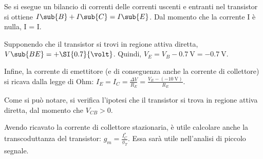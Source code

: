Se si esegue un bilancio di correnti delle correnti uscenti e entranti nel transistor si ottiene $I\sub{B}+I\sub{C}=I\sub{E}$. Dal momento che la corrente I è nulla, I = I.

Supponendo che il transistor si trovi in regione attiva diretta, $V\sub{BE}=+\SI{0.7}{\volt}$. Quindi, $V_E=V_B-\SI{0.7}{\volt}= -\SI{0.7}{\volt}$.

Infine, la corrente di emettitore (e di conseguenza anche la corrente di collettore) si ricava dalla legge di Ohm: $I_E=I_C=\frac{\Delta V}{R_E}=\frac{V_E-(-\SI{10}{\volt})}{R_E}$. 

Come si può notare, si verifica l'ipotesi che il transistor si trova in regione attiva diretta, dal momento che $V_{CB}>0$.

Avendo ricavato la corrente di collettore stazionaria, è utile calcolare anche la transcoduttanza del transistor: $g_m=\frac{I_C^*}{\phi_T}$. Essa sarà utile nell'analisi di piccolo segnale.
